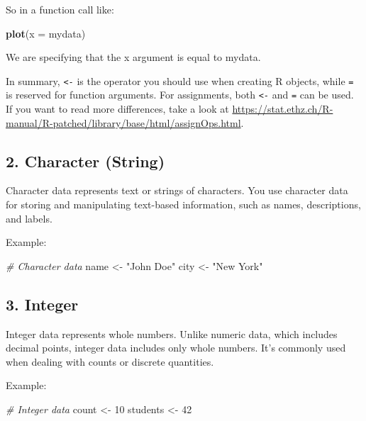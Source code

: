 \documentclass[
]{book}
\newenvironment{Shaded}{\begin{snugshade}}{\end{snugshade}}
\newcommand{\AttributeTok}[1]{\textcolor[rgb]{0.13,0.29,0.53}{#1}}
\newcommand{\CommentTok}[1]{\textcolor[rgb]{0.56,0.35,0.01}{\textit{#1}}}
\newcommand{\DecValTok}[1]{\textcolor[rgb]{0.00,0.00,0.81}{#1}}
\newcommand{\FunctionTok}[1]{\textcolor[rgb]{0.13,0.29,0.53}{\textbf{#1}}}
\newcommand{\NormalTok}[1]{#1}
\newcommand{\OtherTok}[1]{\textcolor[rgb]{0.56,0.35,0.01}{#1}}
\newcommand{\StringTok}[1]{\textcolor[rgb]{0.31,0.60,0.02}{#1}}
\begin{document}
So in a function call like:

\begin{Shaded}
\begin{Highlighting}[]
\FunctionTok{plot}\NormalTok{(}\AttributeTok{x =}\NormalTok{ mydata)}
\end{Highlighting}
\end{Shaded}

We are specifying that the x argument is equal to mydata.

In summary, \texttt{\textless{}-} is the operator you should use when creating R objects, while
\texttt{=} is reserved for function arguments. For assignments, both \texttt{\textless{}-} and \texttt{=} can be used.
If you want to read more differences, take a look at \url{https://stat.ethz.ch/R-manual/R-patched/library/base/html/assignOps.html}.

\hypertarget{character-string}{%
\subsection{2. Character (String)}\label{character-string}}

Character data represents text or strings of characters. You use character data for storing and manipulating text-based information, such as names, descriptions, and labels.

Example:

\begin{Shaded}
\begin{Highlighting}[]
\CommentTok{\# Character data}
\NormalTok{name }\OtherTok{\textless{}{-}} \StringTok{"John Doe"}
\NormalTok{city }\OtherTok{\textless{}{-}} \StringTok{"New York"}
\end{Highlighting}
\end{Shaded}

\hypertarget{integer}{%
\subsection{3. Integer}\label{integer}}

Integer data represents whole numbers. Unlike numeric data, which includes decimal points, integer data includes only whole numbers. It's commonly used when dealing with counts or discrete quantities.

Example:

\begin{Shaded}
\begin{Highlighting}[]
\CommentTok{\# Integer data}
\NormalTok{count }\OtherTok{\textless{}{-}} \DecValTok{10}
\NormalTok{students }\OtherTok{\textless{}{-}} \DecValTok{42}
\end{Highlighting}
\end{Shaded}
\end{document}
